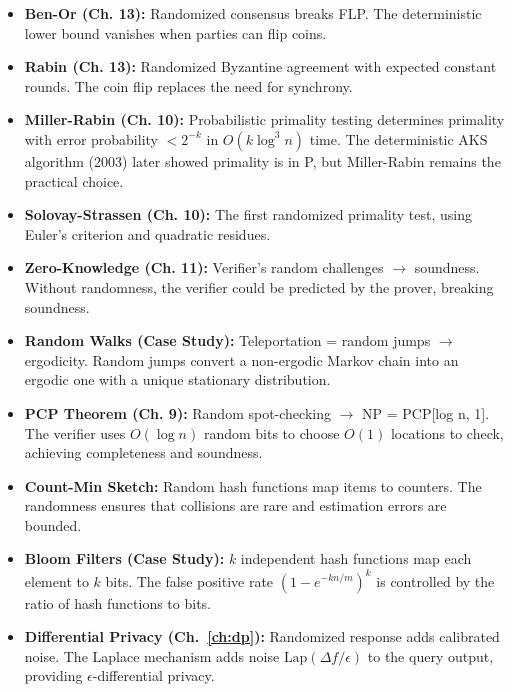\begin{itemize}
\item \textbf{Ben-Or (Ch. 13):} Randomized consensus breaks FLP. The deterministic lower bound vanishes when parties can flip coins.

\item \textbf{Rabin (Ch. 13):} Randomized Byzantine agreement with expected constant rounds. The coin flip replaces the need for synchrony.

\item \textbf{Miller-Rabin (Ch. 10):} Probabilistic primality testing determines primality with error probability $< 2^{-k}$ in $O(k \log^3 n)$ time. The deterministic AKS algorithm (2003) later showed primality is in P, but Miller-Rabin remains the practical choice.

\item \textbf{Solovay-Strassen (Ch. 10):} The first randomized primality test, using Euler's criterion and quadratic residues.

\item \textbf{Zero-Knowledge (Ch. 11):} Verifier's random challenges $\to$ soundness. Without randomness, the verifier could be predicted by the prover, breaking soundness.

\item \textbf{Random Walks (Case Study):} Teleportation = random jumps $\to$ ergodicity. Random jumps convert a non-ergodic Markov chain into an ergodic one with a unique stationary distribution.

\item \textbf{PCP Theorem (Ch. 9):} Random spot-checking $\to$ NP = PCP[log n, 1]. The verifier uses $O(\log n)$ random bits to choose $O(1)$ locations to check, achieving completeness and soundness.

\item \textbf{Count-Min Sketch:} Random hash functions map items to counters. The randomness ensures that collisions are rare and estimation errors are bounded.

\item \textbf{Bloom Filters (Case Study):} $k$ independent hash functions map each element to $k$ bits. The false positive rate $(1 - e^{-kn/m})^k$ is controlled by the ratio of hash functions to bits.

\item \textbf{Differential Privacy (Ch.~\ref{ch:dp}):} Randomized response adds calibrated noise. The Laplace mechanism adds noise $\text{Lap}(\Delta f / \epsilon)$ to the query output, providing $\epsilon$-differential privacy.


\end{itemize}
